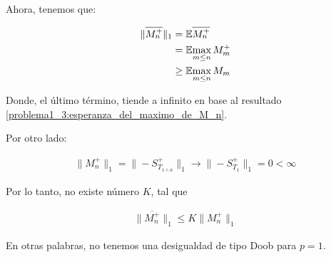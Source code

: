	Ahora, tenemos que:
    
	\begin{align}
		\|\overline{M_{n}^{+}}\|_1  &=    \mathbb{E}{\overline{M_{n}^{+}}} \\
									&=    \mathbb{E}{\max_{m \leq n}M_m^+} \\
									&\geq \mathbb{E}{\max_{m \leq n}M_m}										
	\end{align}\par\null
		
	Donde, el último término, tiende a infinito en base al resultado 
	\eqref{problema1_3:esperanza_del_maximo_de_M_n}.\par\null

	Por otro lado:
    
	\begin{align}
		\|M_n^+\|_1=\|-S_{T_{1\wedge n}}^{+}\|_1  \longrightarrow  \|-S_{T_1}^+\|_1 = 0 < \infty
	\end{align}\par\null
	
	Por lo tanto, no existe número $K$, tal que
	
    \begin{align}
		 \|\overline{M_n^+}\|_1 \leq  K \|M_n^+\|_1
	\end{align}\par\null
	
	En otras palabras, no tenemos una desigualdad de tipo Doob para $p=1$.